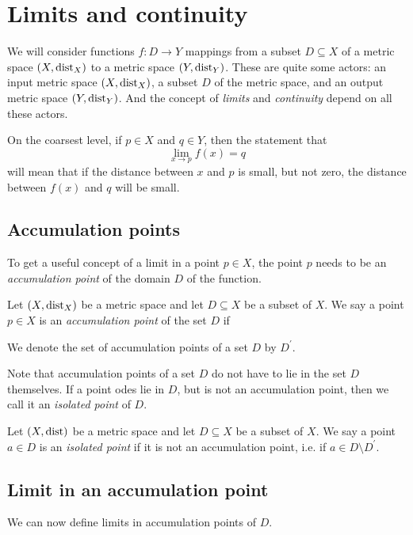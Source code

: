 \section{Limits and continuity}
We will consider functions $f: D \to Y$ mappings from a subset $D \subseteq X$ of a metric space $(X, \text{dist}_X)$ to
a metric space $(Y, \text{dist}_Y)$. These are quite some actors: an input metric space $(X, \text{dist}_X)$, a subset $D$ of the
metric space, and an output metric space $(Y, \text{dist}_Y)$. And the concept of \emph{limits} and \emph{continuity} depend
on all these actors.

On the coarsest level, if $p \in X$ and $q \in Y$, then the statement that
$$\lim_{x\to p}f(x) = q$$
will mean that if the distance between $x$ and $p$ is small, but not zero, the distance between $f(x)$ and $q$ will be small.

\subsection{Accumulation points}
To get a useful concept of a limit in a point $p \in X$, the point $p$ needs to be an \emph{accumulation point} of the
domain $D$ of the function.
\begin{definition}
    Let $(X, \text{dist}_X)$ be a metric space and let $D \subseteq X$ be a subset of $X$. We say a point $p \in X$ is
    an \emph{accumulation point} of the set $D$ if
    \begin{myCenter}
    \end{myCenter}
    We denote the set of accumulation points of a set $D$ by $D^\prime$.
\end{definition}

Note that accumulation points of a set $D$ do not have to lie in the set $D$ themselves. If a point odes lie in $D$,
but is not an accumulation point, then we call it an \emph{isolated point} of $D$.

\begin{definition}
    Let $(X, \text{dist})$ be a metric space and let $D \subseteq X$ be a subset of $X$. We say a point $a \in D$ is an 
    \emph{isolated point} if it is not an accumulation point, i.e. if $a \in D \setminus D^\prime$.
\end{definition}

\subsection{Limit in an accumulation point}
We can now define limits in accumulation points of $D$.

